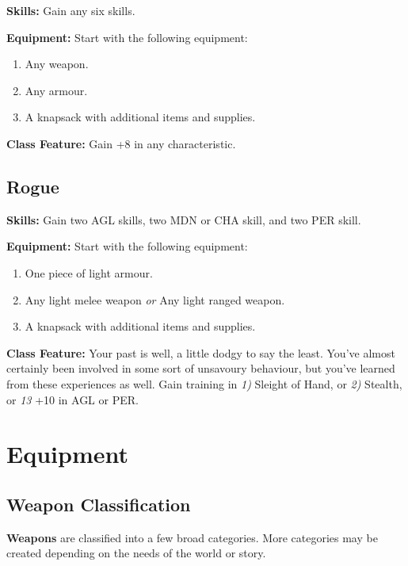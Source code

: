 \documentclass[12pt,]{article}
\providecommand{\tightlist}{%
  \setlength{\itemsep}{0pt}\setlength{\parskip}{0pt}}
\begin{document}
\textbf{Skills:} Gain any six skills.

\textbf{Equipment:} Start with the following equipment:

\begin{enumerate}
\def\labelenumi{\arabic{enumi}.}
\tightlist
\item
  Any weapon.
\item
  Any armour.
\item
  A knapsack with additional items and supplies.
\end{enumerate}

\textbf{Class Feature:} Gain +8 in any characteristic.

\subsection{Rogue}\label{rogue}

\textbf{Skills:} Gain two AGL skills, two MDN or CHA skill, and two PER
skill.

\textbf{Equipment:} Start with the following equipment:

\begin{enumerate}
\def\labelenumi{\arabic{enumi}.}
\tightlist
\item
  One piece of light armour.
\item
  Any light melee weapon \emph{or} Any light ranged weapon.
\item
  A knapsack with additional items and supplies.
\end{enumerate}

\textbf{Class Feature:} Your past is well, a little dodgy to say the
least. You've almost certainly been involved in some sort of unsavoury
behaviour, but you've learned from these experiences as well. Gain
training in \emph{1)} Sleight of Hand, or \emph{2)} Stealth, or
\emph{13} +10 in AGL or PER.

\section{Equipment}\label{equipment-1}

\subsection{Weapon Classification}\label{weapon-classification}

\textbf{Weapons} are classified into a few broad categories. More
categories may be created depending on the needs of the world or story.
\end{document}
